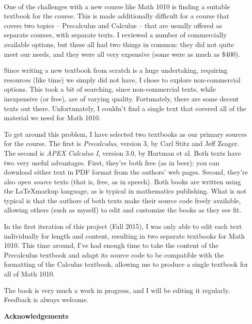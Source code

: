 \thispagestyle{empty}
\Huge
{}\\
\normalsize

One of the challenges with a new course like Math 1010 is finding a suitable textbook for the course. This is made additionally difficult for a course that covers two topics -- Precalculus and Calculus -- that are usually offered as separate courses, with separate texts. I reviewed a number of commercially available options, but these all had two things in common: they did not quite meet our needs, and they were all very expensive (some were as much as \$400).

Since writing a new textbook from scratch is a huge undertaking, requiring resources (like time) we simply did not have, I chose to explore non-commercial options. This took a bit of searching, since non-commercial texts, while inexpensive (or free), are of varying quality. Fortunately, there are some decent texts out there. Unfortunately, I couldn't find a single text that covered all of the material we need for Math 1010.

To get around this problem, I have selected two textbooks as our primary sources for the course. The first is \textit{Precalculus}, version 3, by Carl Stitz and Jeff Zeager. The second is \textit{APEX Calculus I},  version 3.0, by Hartman et al. Both texts have two very useful advantages. First, they're both free (as in beer): you can download either text in PDF format from the authors' web pages. Second, they're also \textit{open source} texts (that is, free, as in speech). Both books are written using the \LaTeX markup language, as is typical in mathematics publishing. What is not typical is that the authors of both texts make their source code freely available, allowing others (such as myself) to edit and customize the books as they see fit.

In the first iteration of this project (Fall 2015), I was only able to edit each text individually for length and content, resulting in two separate textbooks for Math 1010. This time around, I've had enough time to take the content of the Precalculus textbook and adapt its source code to be compatible with the formatting of the Calculus textbook, allowing me to produce a single textbook for all of Math 1010.

The book is very much a work in progress, and I will be editing it regularly. Feedback is always welcome. 

\newpage

\noindent\textbf{\large Acknowledgements}\\

